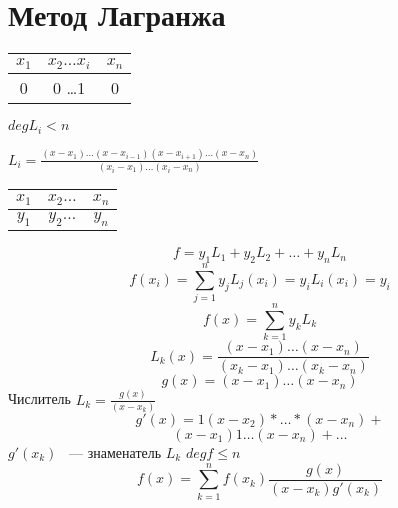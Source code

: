 ﻿\section{Метод Лагранжа}

\begin{tabular}{c|c|c}
$x_1$ & $x_2 \ldots x_i$ & $x_n$\\
\hline
0 & 0 \ldots 1 & 0\\
\end{tabular}

$deg L_i < n$

$L_i = \frac{(x - x_1) \ldots (x - x_{i - 1})(x - x_{i + 1}) \ldots(x - x_n)}{(x_i - x_1) \ldots (x_i - x_n)}$

\begin{tabular}{c|c|c}
$x_1$ & $x_2 \ldots$ & $x_n$\\
\hline
$y_1$ & $y_2 \ldots$ & $y_n$\\
\end{tabular}

$$f = y_1L_1 + y_2L_2 + \ldots + y_n L_n$$
$$f(x_i) = \sum_{j = 1}^{n}y_jL_j(x_i) = y_iL_i(x_i) = y_i$$
$$f(x) = \sum_{k = 1}^{n}y_kL_k$$
$$L_k(x) = \frac{(x - x_1) \ldots (x - x_n)}{(x_k - x_1) \ldots (x_k - x_n)}$$
$$g(x) = (x - x_1) \ldots (x - x_n)$$
Числитель $L_k = \frac{g(x)}{(x - x_k)}$
$$g'(x) = 1(x - x_2)* \ldots * (x - x_n) +$$
$$(x - x_1)1 \ldots (x - x_n) + \ldots$$
$g'(x_k)$ ~--- знаменатель $L_k$
$deg f \le n$
$$f(x) = \sum_{k = 1}^{n}f(x_k)\frac{g(x)}{(x - x_k)g'(x_k)}$$ 
